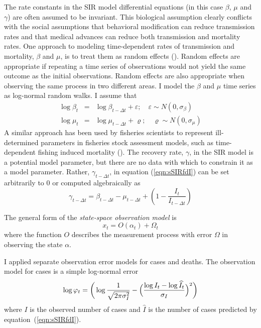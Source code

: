 \documentclass[12pt,letterpaper]{article}
\begin{document}
The rate constants in the SIR model differential equations (in this
case $\beta$, $\mu$ and $\gamma$) are often assumed to be invariant.
This biological assumption clearly conflicts with the social
assumptions
that behavioral modification can reduce transmission rates and
that medical advances can reduce both transmission and mortality
rates.
One approach to modeling time-dependent rates of transmission and
mortality, $\beta$ and $\mu$, is to treat them as random effects
(\cite{Skaug2006}). Random effects are appropriate if repeating a time
series of observations would not yield the same outcome as the initial
observations. Random effects are also appropriate when observing
the same process in two different areas. I model the  $\beta$ and
$\mu$ time series as log-normal random walks. I assume that
\begin{eqnarray}
\log\beta_t &=& \log\beta_{t-\Delta t}+\varepsilon;\quad \varepsilon\sim 
N(0,\sigma_\beta)\\
\log\mu_t &=& \log\mu_{t-\Delta t}+\varrho;\quad \varrho\sim
N(0,\sigma_\mu)
\end{eqnarray}
A similar approach has been used by fisheries scientists to represent
ill-determined parameters in fisheries stock assessment models, such
as time-dependent fishing induced mortality
(\cite{Nielsen2014b,Sibert2017}).
The recovery rate, $\gamma$, in the SIR model is a potential model
parameter, but there are no data with which to constrain it as a model
parameter. Rather, $\gamma_{t-\Delta t}$, in equation
(\ref{eqn:sSIRfdI}) can be set arbitrarily to 0 or computed algebraically as
\begin{equation}
\label{eqn:gamma}
\gamma_{t-\Delta t} = \beta_{t-\Delta t} - \mu_{t-\Delta t} +
(1-\frac{I_t}{I_{t-\Delta t}})
\end{equation}

The general form of the {\itshape state-space observation model} is
\begin{equation}
x_t = O(\alpha_t) + \Omega_t
\end{equation}
where the function $O$ describes the measurement process with
error $\Omega$ in observing the state $\alpha$.

I applied separate observation error models for cases and
deaths. The observation model for cases is a simple log-normal error
\begin{equation}
\label{eqn:logNlike}
\log\varphi_t = \bigg(\log\frac{1}{\sqrt{2\pi\sigma^2_I}} -\Bigl(\frac{\log
I_t-\log\widehat{I}_t}{\sigma_I}\Bigr)^2\bigg)\\
\end{equation}
where $I$ is the observed number of cases and $\widehat{I}$ is the
number of cases predicted by equation~(\ref{eqn:sSIRfdI}).
\end{document}
